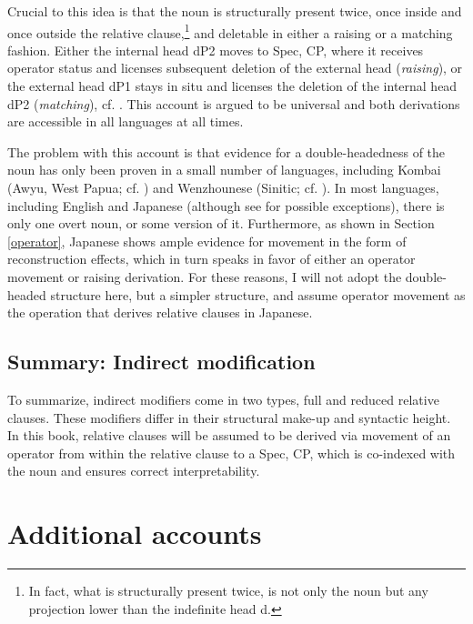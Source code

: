 Crucial to this idea is that the noun is structurally present twice, once inside and once outside the relative clause,\footnote{In fact, what is structurally present twice, is not only the noun but any projection lower than the indefinite head d.} and deletable in either a raising or a matching fashion. Either the internal head dP2 moves to Spec, CP, where it receives operator status and licenses subsequent deletion of the external head (\textit{raising}), or the external head dP1 stays in situ and licenses the deletion of the internal head dP2 (\textit{matching}), cf. \citet[25–45]{cinque:2020:relcl}. This account is argued to be universal and both derivations are accessible in all languages at all times.

The problem with this account is that evidence for a double-headedness of the noun has only been proven in a small number of languages, including  Kombai (Awyu, West Papua; cf. \citealt{vries:2020:greater}) and  Wenzhounese (Sinitic; cf. \citealt{hu:2018:new}). In most languages, including  English and Japanese (although see \citealt{erlewine:2016:unifying} for possible exceptions), there is only one overt noun, or some version of it. Furthermore, as shown in Section \ref{operator}, Japanese shows ample evidence for movement in the form of reconstruction effects, which in turn speaks in favor of either an operator movement or raising derivation. For these reasons, I will not adopt the double-headed structure here, but a simpler structure, and assume operator movement as the operation that derives relative clauses in Japanese.

\subsection{Summary: Indirect modification}

To summarize, indirect modifiers come in two types, full and reduced relative clauses. These modifiers differ in their structural make-up and syntactic height. In this book, relative clauses will be assumed to be derived via movement of an operator from within the relative clause to a Spec, CP, which is co-indexed with the noun and ensures correct interpretability.

\section{Additional accounts}

